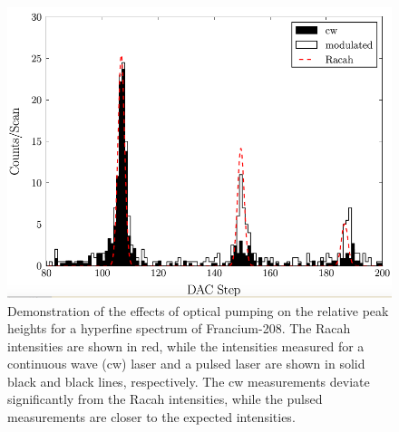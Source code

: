 \begin{figure}[h]
\includegraphics[width=\textwidth]{Graphics/francium.png}
\caption[Demonstration of the effects of optical pumping on the relative peak heights for a hyperfine spectrum of Francium-208.]{\small Demonstration of the effects of optical pumping on the relative peak heights for a hyperfine spectrum of Francium-208. The Racah intensities are shown in red, while the intensities measured for a continuous wave (cw) laser and a pulsed laser are shown in solid black and black lines, respectively. The cw measurements deviate significantly from the Racah intensities, while the pulsed measurements are closer to the expected intensities.\cite{CFBS}}
\label{OP_francium}
\end{figure}

